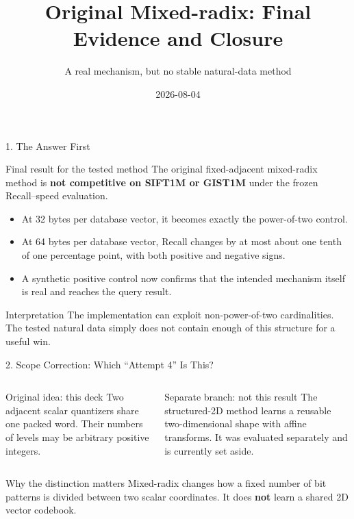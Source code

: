 \documentclass[aspectratio=169]{beamer}
\title{Original Mixed-radix: Final Evidence and Closure}
\subtitle{A real mechanism, but no stable natural-data method}
\author{}
\date{2026-08-04}
\begin{document}
\begin{frame}\titlepage\end{frame}

\begin{frame}{1. The Answer First}
\begin{alertblock}{Final result for the tested method}
The original fixed-adjacent mixed-radix method is \textbf{not competitive on
SIFT1M or GIST1M} under the frozen Recall--speed evaluation.
\end{alertblock}
\begin{itemize}
  \item At 32 bytes per database vector, it becomes exactly the power-of-two
  control.
  \item At 64 bytes per database vector, Recall changes by at most about one tenth of one
  percentage point, with both positive and negative signs.
  \item A synthetic positive control now confirms that the intended mechanism
  itself is real and reaches the query result.
\end{itemize}
\begin{block}{Interpretation}
The implementation can exploit non-power-of-two cardinalities. The tested
natural data simply does not contain enough of this structure for a useful win.
\end{block}
\end{frame}

\begin{frame}{2. Scope Correction: Which ``Attempt 4'' Is This?}
\begin{columns}[T]
\begin{block}{Original idea: this deck}
Two adjacent scalar quantizers share one packed word. Their numbers of levels
may be arbitrary positive integers.
\end{block}
\begin{block}{Separate branch: not this result}
The structured-2D method learns a reusable two-dimensional shape with affine
transforms. It was evaluated separately and is currently set aside.
\end{block}
\end{columns}
\begin{alertblock}{Why the distinction matters}
Mixed-radix changes how a fixed number of bit patterns is divided between two
scalar coordinates. It does \textbf{not} learn a shared 2D vector codebook.
\end{alertblock}
\end{frame}
\end{document}

